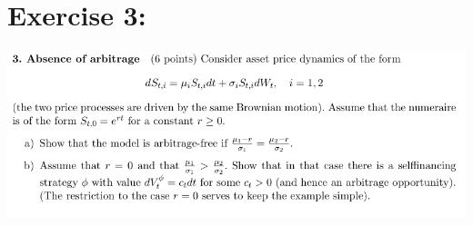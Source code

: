 \documentclass[document.tex]{subfiles}
\begin{document}
\section*{Exercise 3:}

\includegraphics[width=\textwidth]{ex3.png}
\end{document}
